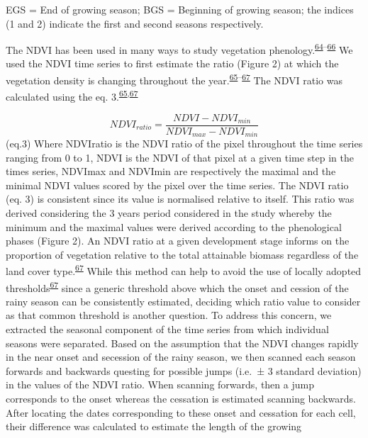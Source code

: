 \documentclass[12pt,oneside]{article}
\begin{document}
EGS = End of growing season; BGS = Beginning of growing season; the
indices (1 and 2) indicate the first and second seasons respectively.

The NDVI has been used in many ways to study vegetation
phenology.\textsuperscript{\protect\hyperlink{ref-DeLeeuw_et_al_2012}{64}--\protect\hyperlink{ref-Yu_et_al_2012}{66}}
We used the NDVI time series to first estimate the ratio (Figure 2) at
which the vegetation density is changing throughout the
year.\textsuperscript{\protect\hyperlink{ref-Yu_et_al_2010}{65}--\protect\hyperlink{ref-White_et_al_1997}{67}}
The NDVI ratio was calculated using the eq.
3.\textsuperscript{\protect\hyperlink{ref-Yu_et_al_2010}{65},\protect\hyperlink{ref-White_et_al_1997}{67}}

\[NDVI_{ratio} =   \frac{NDVI-NDVI_{min}}{NDVI_{max} - NDVI_{min}}\]
(eq.3) Where NDVIratio is the NDVI ratio of the pixel throughout the
time series ranging from 0 to 1, NDVI is the NDVI of that pixel at a
given time step in the times series, NDVImax and NDVImin are
respectively the maximal and the minimal NDVI values scored by the pixel
over the time series. The NDVI ratio (eq. 3) is consistent since its
value is normalised relative to itself. This ratio was derived
considering the 3 years period considered in the study whereby the
minimum and the maximal values were derived according to the
phenological phases (Figure 2). An NDVI ratio at a given development
stage informs on the proportion of vegetation relative to the total
attainable biomass regardless of the land cover
type.\textsuperscript{\protect\hyperlink{ref-White_et_al_1997}{67}}
While this method can help to avoid the use of locally adopted
thresholds\textsuperscript{\protect\hyperlink{ref-White_et_al_1997}{67}}
since a generic threshold above which the onset and cession of the rainy
season can be consistently estimated, deciding which ratio value to
consider as that common threshold is another question. To address this
concern, we extracted the seasonal component of the time series from
which individual seasons were separated. Based on the assumption that
the NDVI changes rapidly in the near onset and secession of the rainy
season, we then scanned each season forwards and backwards questing for
possible jumps (i.e.~± 3 standard deviation) in the values of the NDVI
ratio. When scanning forwards, then a jump corresponds to the onset
whereas the cessation is estimated scanning backwards. After locating
the dates corresponding to these onset and cessation for each cell,
their difference was calculated to estimate the length of the growing
\end{document}
